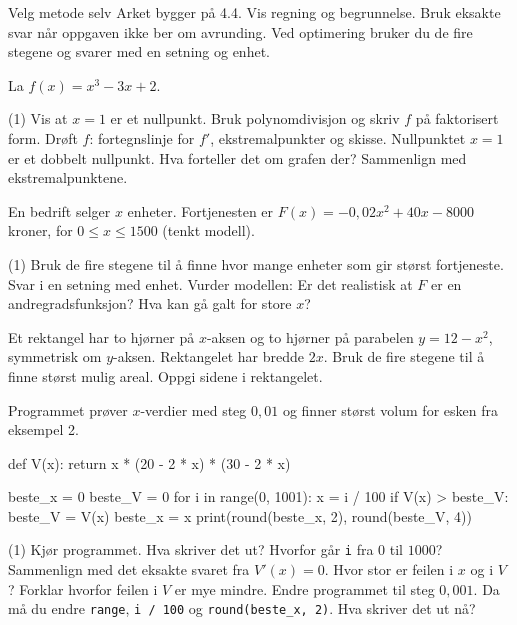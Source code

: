 
\begin{infoboks}{Velg metode selv}
Arket bygger på 4.4. Vis regning og begrunnelse. Bruk eksakte svar når oppgaven ikke ber om avrunding.
Ved optimering bruker du de fire stegene og svarer med en setning og enhet.
\end{infoboks}


La $f(x) = x^3 - 3x + 2$.
\begin{tasks}(1)
  \task Vis at $x = 1$ er et nullpunkt. Bruk polynomdivisjon og skriv $f$ på faktorisert form.
  \task Drøft $f$: fortegnslinje for $f'$, ekstremalpunkter og skisse.
  \task Nullpunktet $x = 1$ er et dobbelt nullpunkt. Hva forteller det om grafen der? Sammenlign med ekstremalpunktene.
\end{tasks}

En bedrift selger $x$ enheter. Fortjenesten er $F(x) = -0,02x^2 + 40x - 8000$ kroner, for $0 \le x \le 1500$ (tenkt modell).
\begin{tasks}(1)
  \task Bruk de fire stegene til å finne hvor mange enheter som gir størst fortjeneste. Svar i en setning med enhet.
  \task Vurder modellen: Er det realistisk at $F$ er en andregradsfunksjon? Hva kan gå galt for store $x$?
\end{tasks}

Et rektangel har to hjørner på $x$-aksen og to hjørner på parabelen $y = 12 - x^2$, symmetrisk om $y$-aksen. Rektangelet har bredde $2x$.
Bruk de fire stegene til å finne størst mulig areal. Oppgi sidene i rektangelet.

Programmet prøver $x$-verdier med steg $0,01$ og finner størst volum for esken fra eksempel 2.
\begin{kode}
def V(x):
    return x * (20 - 2 * x) * (30 - 2 * x)

beste_x = 0
beste_V = 0
for i in range(0, 1001):
    x = i / 100
    if V(x) > beste_V:
        beste_V = V(x)
        beste_x = x
print(round(beste_x, 2), round(beste_V, 4))
\end{kode}
\begin{tasks}(1)
  \task Kjør programmet. Hva skriver det ut? Hvorfor går \texttt{i} fra $0$ til $1000$?
  \task Sammenlign med det eksakte svaret fra $V'(x) = 0$. Hvor stor er feilen i $x$ og i $V$? Forklar hvorfor feilen i $V$ er mye mindre.
  \task Endre programmet til steg $0,001$. Da må du endre \texttt{range}, \texttt{i / 100} og \texttt{round(beste\_x, 2)}. Hva skriver det ut nå?
\end{tasks}

